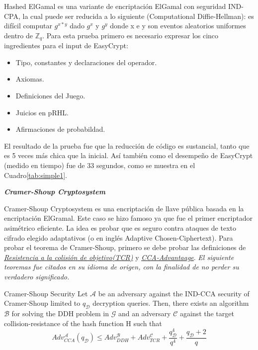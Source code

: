 \documentclass[runningheads,a4paper]{llncs}
\begin{document}
Hashed ElGamal es una variante de encriptación ElGamal con seguridad IND-CPA, la cual puede ser reducida a lo siguiente (Computational Diffie-Hellman): es difícil computar $g^{x*y}$ dado $g^x$ y $g^y$ donde x e y son eventos aleatorios uniformes dentro de $\mathbb{Z}_q$.
Para esta prueba primero es necesario expresar los cinco ingredientes para el input de EasyCrypt:
\begin{itemize}
	\item Tipo, constantes y declaraciones del operador.
	\item Axiomas.
	\item Definiciones del Juego.
	\item Juicios en pRHL.
	\item Afirmaciones de probabildad.
\end{itemize}

El resultado de la prueba fue que la reducción de código es sustancial, tanto que es 5 veces más chica que la inicial. Así también como el desempeño de EasyCrypt (medido en tiempo) fue de 33 segundos, como se muestra en el Cuadro\ref{tab:simple1}.\cite{article3}




\centerline{\textbf{{\emph{Cramer-Shoup Cryptosystem}}}}

Cramer-Shoup Cryptosystem es una encriptación de llave pública basada en la encriptación ElGramal. Este caso se hizo famoso ya que fue el primer encriptador asimétrico eficiente. La idea es probar que es seguro contra ataques de texto cifrado elegido adaptativos (o en inglés Adaptive Chosen-Ciphertext).
Para probar el teorema de Cramer-Shoup, primero se debe probar las definiciones de \href{https://en.wikipedia.org/wiki/Collision_resistance}{\emph{Resistencia a la colisión de objetivo(TCR)}} y \href{https://en.wikipedia.org/wiki/Advantage_(cryptography)}{\emph{CCA-Advantaage}}.
\emph{El siguiente teoremas fue citados en su idioma de origen, con la finalidad de no perder su verdadero significado.}

\begin{theorem}{Cramer-Shoup Security}
Let $\mathcal{A}$ be an adversary against the IND-CCA security
of Cramer-Shoup limited to $q_\mathcal{D}$ decryption queries. Then, there exists an algorithm $\mathcal{B}$ for solving the
DDH problem in $\mathcal{G}$ and an adversary $\mathcal{C}$ against the target collision-resistance of the hash function H
such that
\[Adv_{CCA}^\mathcal{A}(q_\mathcal{D}) \leq Adv_{DDH}^\mathcal{B} + Adv_{TCR}^\mathcal{C} + \frac{q_\mathcal{D}^4}{q^4} + \frac{q_\mathcal{D} + 2}{q}\]
\end{theorem}
\end{document}
